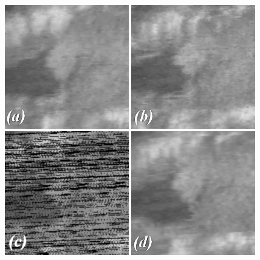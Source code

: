 	\begin{figure}[h]
	\centering
	\includegraphics[width=0.48\textwidth]{graphics/crop_pnn.png}
	\includegraphics[width=0.48\textwidth]{graphics/crop_vnn.png}
	\includegraphics[width=0.48\textwidth]{graphics/crop_pnn_holes.png}
	\includegraphics[width=0.48\textwidth]{graphics/crop_dwop4.png}

\end{figure}
